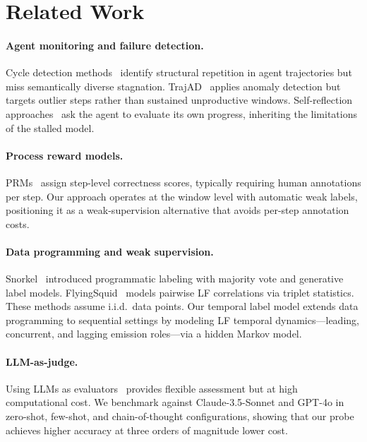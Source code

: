 \documentclass[11pt,a4paper]{article}
\begin{document}
\section{Related Work}
\label{sec:related}

\paragraph{Agent monitoring and failure detection.}
Cycle detection methods~\cite{zhuge2024cdcs,zhang2024specra} identify structural repetition in agent trajectories but miss semantically diverse stagnation. TrajAD~\cite{li2024trajad} applies anomaly detection but targets outlier steps rather than sustained unproductive windows. Self-reflection approaches~\cite{shinn2023reflexion,yao2024tree,hao2023reasoning} ask the agent to evaluate its own progress, inheriting the limitations of the stalled model.

\paragraph{Process reward models.}
PRMs~\cite{lightman2023lets,wang2024mathshepherd,uesato2022solving} assign step-level correctness scores, typically requiring human annotations per step. Our approach operates at the window level with automatic weak labels, positioning it as a weak-supervision alternative that avoids per-step annotation costs.

\paragraph{Data programming and weak supervision.}
Snorkel~\cite{ratner2017snorkel} introduced programmatic labeling with majority vote and generative label models. FlyingSquid~\cite{fu2020fast} models pairwise LF correlations via triplet statistics. These methods assume i.i.d.\ data points. Our temporal label model extends data programming to sequential settings by modeling LF temporal dynamics---leading, concurrent, and lagging emission roles---via a hidden Markov model.

\paragraph{LLM-as-judge.}
Using LLMs as evaluators~\cite{zheng2024judging,dubois2024alpacafarm} provides flexible assessment but at high computational cost. We benchmark against Claude-3.5-Sonnet and GPT-4o in zero-shot, few-shot, and chain-of-thought configurations, showing that our probe achieves higher accuracy at three orders of magnitude lower cost.
\end{document}
